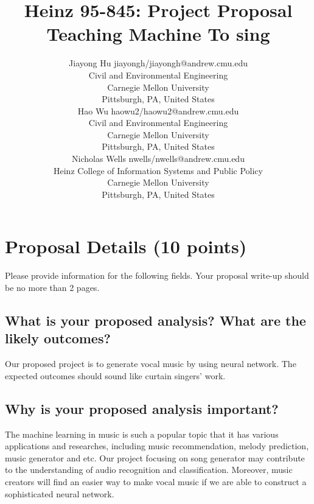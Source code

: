 \documentclass[twoside,11pt]{article}
\begin{document}
\title{Heinz 95-845: Project Proposal\\Teaching Machine To sing}

\author{\name Jiayong Hu \email jiayongh/jiayongh@andrew.cmu.edu \\
       \addr Civil and Environmental Engineering\\
       Carnegie Mellon University\\
       Pittsburgh, PA, United States \\
       \AND
       \name Hao Wu \email haowu2/haowu2@andrew.cmu.edu \\
       \addr Civil and Environmental Engineering\\
       Carnegie Mellon University\\
       Pittsburgh, PA, United States \\
       \AND
       \name Nicholas Wells \email nwells/nwells@andrew.cmu.edu \\
       \addr Heinz College of Information Systems and Public Policy\\
       Carnegie Mellon University\\
       Pittsburgh, PA, United States}
\maketitle

\section{Proposal Details (10 points)} \label{details}
Please provide information for the following fields. Your proposal write-up should be no more than 2 pages.

\subsection{What is your proposed analysis? What are the likely outcomes?}
Our proposed project is to generate vocal music by using neural network. The expected outcomes should sound like curtain singers’ work.

\subsection{Why is your proposed analysis important?}
The machine learning in music is such a popular topic that it has various applications and researches, including music recommendation, melody prediction, music generator and etc. Our project focusing on song generator may contribute to the understanding of audio recognition and classification. Moreover, music creators will find an easier way to make vocal music if we are able to construct a sophisticated neural network.
\end{document}
